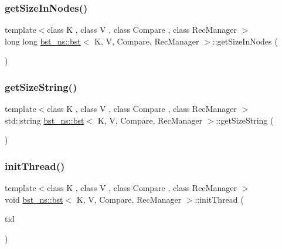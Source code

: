 \mbox{\label{classbst__ns_1_1bst_aa9e0e2565d7d7d11ac3c64dd5c1df6ad}} 
\subsubsection{\texorpdfstring{get\+Size\+In\+Nodes()}{getSizeInNodes()}\hspace{0.1cm}{\footnotesize\ttfamily [2/2]}}
{\footnotesize\ttfamily template$<$class K , class V , class Compare , class Rec\+Manager $>$ \\
long long \hyperlink{classbst__ns_1_1bst}{bst\+\_\+ns\+::bst}$<$ K, V, Compare, Rec\+Manager $>$\+::get\+Size\+In\+Nodes (\begin{DoxyParamCaption}{ }\end{DoxyParamCaption})\hspace{0.3cm}{\ttfamily [inline]}}

\mbox{\label{classbst__ns_1_1bst_adb0dbcb9e07a12a10bd63ba3a7d7673a}} 
\subsubsection{\texorpdfstring{get\+Size\+String()}{getSizeString()}}
{\footnotesize\ttfamily template$<$class K , class V , class Compare , class Rec\+Manager $>$ \\
std\+::string \hyperlink{classbst__ns_1_1bst}{bst\+\_\+ns\+::bst}$<$ K, V, Compare, Rec\+Manager $>$\+::get\+Size\+String (\begin{DoxyParamCaption}{ }\end{DoxyParamCaption})\hspace{0.3cm}{\ttfamily [inline]}}

\mbox{\label{classbst__ns_1_1bst_a3cfb3ede09f269633f96bb3d83c9b216}} 
\subsubsection{\texorpdfstring{init\+Thread()}{initThread()}}
{\footnotesize\ttfamily template$<$class K , class V , class Compare , class Rec\+Manager $>$ \\
void \hyperlink{classbst__ns_1_1bst}{bst\+\_\+ns\+::bst}$<$ K, V, Compare, Rec\+Manager $>$\+::init\+Thread (\begin{DoxyParamCaption}\item[{const int}]{tid }\end{DoxyParamCaption})\hspace{0.3cm}{\ttfamily [inline]}}

